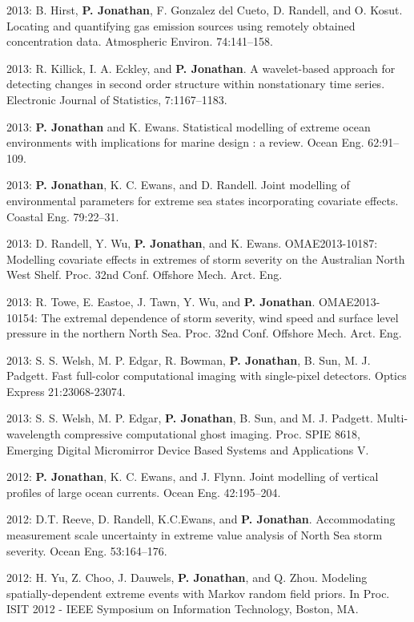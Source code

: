 \documentclass[11pt,a4paper]{moderncv}
\begin{document}
2013: B. Hirst, \textbf{P. Jonathan}, F. Gonzalez del Cueto, D. Randell, and O. Kosut. Locating and quantifying gas emission sources using remotely obtained concentration data. Atmospheric Environ. 74:141--158.

2013: R. Killick, I. A. Eckley, and \textbf{P. Jonathan}. A wavelet-based approach for detecting changes in second order structure within nonstationary time series. Electronic Journal of Statistics, 7:1167--1183.

2013: \textbf{P. Jonathan} and K. Ewans. Statistical modelling of extreme ocean environments with implications for marine design : a review. Ocean Eng. 62:91--109.

2013: \textbf{P. Jonathan}, K. C. Ewans, and D. Randell. Joint modelling of environmental parameters for extreme sea states incorporating covariate effects. Coastal Eng. 79:22--31.

2013: D. Randell, Y. Wu, \textbf{P. Jonathan}, and K. Ewans. OMAE2013-10187: Modelling covariate effects in extremes of storm severity on the Australian North West Shelf. Proc. 32nd Conf. Offshore Mech. Arct. Eng.

2013: R. Towe, E. Eastoe, J. Tawn, Y. Wu, and \textbf{P. Jonathan}. OMAE2013-10154: The extremal dependence of storm severity, wind speed and surface level pressure in the northern North Sea. Proc. 32nd Conf. Offshore Mech. Arct. Eng.

2013: S. S. Welsh, M. P. Edgar, R. Bowman, \textbf{P. Jonathan}, B. Sun, M. J. Padgett. Fast full-color computational imaging with single-pixel detectors. Optics Express 21:23068-23074.

2013: S. S. Welsh, M. P. Edgar, \textbf{P. Jonathan}, B. Sun, and M. J. Padgett. Multi-wavelength compressive computational ghost imaging. Proc. SPIE 8618, Emerging Digital Micromirror Device Based Systems and Applications V.

2012: \textbf{P. Jonathan}, K. C. Ewans, and J. Flynn. Joint modelling of vertical profiles of large ocean currents. Ocean Eng. 42:195--204.

2012: D.T. Reeve, D. Randell, K.C.Ewans, and \textbf{P. Jonathan}. Accommodating measurement scale uncertainty in extreme value analysis of North Sea storm severity. Ocean Eng. 53:164--176.

2012: H. Yu, Z. Choo, J. Dauwels, \textbf{P. Jonathan}, and Q. Zhou. Modeling spatially-dependent extreme events with Markov random field priors. In Proc. ISIT 2012 - IEEE Symposium on Information Technology, Boston, MA.
\end{document}
